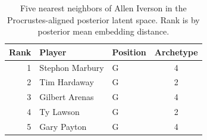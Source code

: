 \begin{table}[htbp]
  \centering\small
  \begin{tabular}{rllc}
    \toprule
    Rank & Player & Position & Archetype \\
    \midrule
    1 & Stephon Marbury & G & 4 \\
    2 & Tim Hardaway & G & 2 \\
    3 & Gilbert Arenas & G & 4 \\
    4 & Ty Lawson & G & 2 \\
    5 & Gary Payton & G & 4 \\
    \bottomrule
  \end{tabular}
  \caption{Five nearest neighbors of Allen Iverson in the Procrustes-aligned posterior latent space. Rank is by posterior mean embedding distance.}
  \label{tab:Allen_Iverson_neighbors}
\end{table}

